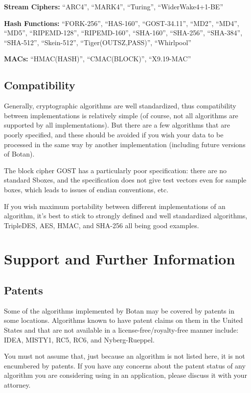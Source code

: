 \documentclass{article}
\begin{document}
\noindent
\textbf{Stream Ciphers:} ``ARC4'', ``MARK4'', ``Turing'', ``WiderWake4+1-BE''

\noindent
\textbf{Hash Functions:} ``FORK-256'', ``HAS-160'', ``GOST-34.11'',
``MD2'', ``MD4'', ``MD5'', ``RIPEMD-128'', ``RIPEMD-160'',
``SHA-160'', ``SHA-256'', ``SHA-384'', ``SHA-512'', ``Skein-512'',
``Tiger(OUTSZ,PASS)'', ``Whirlpool''

\noindent
\textbf{MACs:} ``HMAC(HASH)'', ``CMAC(BLOCK)'', ``X9.19-MAC''

\subsection{Compatibility}

Generally, cryptographic algorithms are well standardized, thus
compatibility between implementations is relatively simple (of course, not all
algorithms are supported by all implementations). But there are a few
algorithms that are poorly specified, and these should be avoided if you wish
your data to be processed in the same way by another implementation (including
future versions of Botan).

The block cipher GOST has a particularly poor specification: there are no
standard Sboxes, and the specification does not give test vectors even for
sample boxes, which leads to issues of endian conventions, etc.

If you wish maximum portability between different implementations of an
algorithm, it's best to stick to strongly defined and well standardized
algorithms, TripleDES, AES, HMAC, and SHA-256 all being good examples.

\pagebreak
\section{Support and Further Information}

\subsection{Patents}

Some of the algorithms implemented by Botan may be covered by patents in some
locations. Algorithms known to have patent claims on them in the United States
and that are not available in a license-free/royalty-free manner include:
IDEA, MISTY1, RC5, RC6, and Nyberg-Rueppel.

You must not assume that, just because an algorithm is not listed here, it is
not encumbered by patents. If you have any concerns about the patent status of
any algorithm you are considering using in an application, please discuss it
with your attorney.
\end{document}
